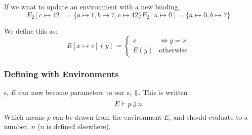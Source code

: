 If we wnat to update an environment with a new binding,
\begin{subequations}\label{eq:Update_Environment}
  \begin{equation}\label{subeq:Update_Environment_New_Variable}
    E_{2} [c \mapsto 42] = \lbrace a \mapsto 1, b \mapsto 7, c \mapsto 42 \rbrace
  \end{equation}
  \begin{equation}\label{subeq:Update_Environment_Update_Variable}
    E_{2} [a \mapsto 0] = \lbrace a \mapsto 0, b \mapsto 7\rbrace
  \end{equation}
\end{subequations}

We define this as:
\begin{equation}\label{eq:Update_Environment_Definition}
  E[x \mapsto v](y) =
  \begin{cases}
    v & \Longleftrightarrow y = x \\
    E(y) & \text{otherwise}
  \end{cases}
\end{equation}

\subsubsection{Defining  with Environments}\label{subsubsec:Define_Semantics_with_Environments}
s, $E$ can now become parameters to our s, $\operatorname{\Downarrow}$.
This is written
\begin{equation}\label{eq:Define_Semantics_with_Environments}
  E \vdash p \operatorname{\Downarrow} n
\end{equation}
Which means $p$ can be drawn from the environment $E$, and should evaluate to a number, $n$ ($n$ is defined elsewhere).

  
